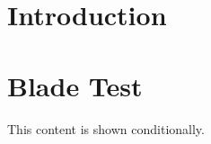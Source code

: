 \documentclass{article}
\newcommand{\blade}[1]{}
\begin{document}
\title{\blade{{ $title }}}
\author{\blade{{ $author }}}
\date{\blade{{ $date }}}
\maketitle

\section{Introduction}
\blade{{ $introduction }}

\section{Blade Test}
\blade{@if($showConditional)}
This content is shown conditionally.
\blade{@endif}

\blade{@foreach($items as $item)}
\item \blade{{ $item }}
\blade{@endforeach}
\end{document}
